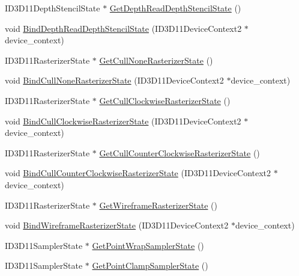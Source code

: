 \begin{DoxyCompactItemize}
\item 
I\+D3\+D11\+Depth\+Stencil\+State $\ast$ \hyperlink{structmage_1_1_rendering_state_cache_adca5a3b2a24505f4c8bcad07ff1d3d42}{Get\+Depth\+Read\+Depth\+Stencil\+State} ()
\item 
void \hyperlink{structmage_1_1_rendering_state_cache_a0b0838c75ad5ed0b84741a111cd061c8}{Bind\+Depth\+Read\+Depth\+Stencil\+State} (I\+D3\+D11\+Device\+Context2 $\ast$device\+\_\+context)
\item 
I\+D3\+D11\+Rasterizer\+State $\ast$ \hyperlink{structmage_1_1_rendering_state_cache_af9c689e85b54cf0af4018c20e3ab61a1}{Get\+Cull\+None\+Rasterizer\+State} ()
\item 
void \hyperlink{structmage_1_1_rendering_state_cache_ae479af6762de7780a8a91476898fb2e5}{Bind\+Cull\+None\+Rasterizer\+State} (I\+D3\+D11\+Device\+Context2 $\ast$device\+\_\+context)
\item 
I\+D3\+D11\+Rasterizer\+State $\ast$ \hyperlink{structmage_1_1_rendering_state_cache_a4055aaf84813811b94ed741c07cbee3c}{Get\+Cull\+Clockwise\+Rasterizer\+State} ()
\item 
void \hyperlink{structmage_1_1_rendering_state_cache_ab49be6f528fbb33db89b2a5d6cd344c4}{Bind\+Cull\+Clockwise\+Rasterizer\+State} (I\+D3\+D11\+Device\+Context2 $\ast$device\+\_\+context)
\item 
I\+D3\+D11\+Rasterizer\+State $\ast$ \hyperlink{structmage_1_1_rendering_state_cache_aa41c6a83a929c09f040dddbd4e21d5fb}{Get\+Cull\+Counter\+Clockwise\+Rasterizer\+State} ()
\item 
void \hyperlink{structmage_1_1_rendering_state_cache_af5d12c1791ad7dd7f3b9916ea8f148a6}{Bind\+Cull\+Counter\+Clockwise\+Rasterizer\+State} (I\+D3\+D11\+Device\+Context2 $\ast$device\+\_\+context)
\item 
I\+D3\+D11\+Rasterizer\+State $\ast$ \hyperlink{structmage_1_1_rendering_state_cache_a86d51235df703c952a1e50d95eae4244}{Get\+Wireframe\+Rasterizer\+State} ()
\item 
void \hyperlink{structmage_1_1_rendering_state_cache_a6c7351dc869d2595b0933a8927759d43}{Bind\+Wireframe\+Rasterizer\+State} (I\+D3\+D11\+Device\+Context2 $\ast$device\+\_\+context)
\item 
I\+D3\+D11\+Sampler\+State $\ast$ \hyperlink{structmage_1_1_rendering_state_cache_a4d1b6eef773700e3fb80195f93b484f9}{Get\+Point\+Wrap\+Sampler\+State} ()
\item 
I\+D3\+D11\+Sampler\+State $\ast$ \hyperlink{structmage_1_1_rendering_state_cache_aabf172b1363478d2570a242303e38838}{Get\+Point\+Clamp\+Sampler\+State} ()

\end{DoxyCompactItemize}
